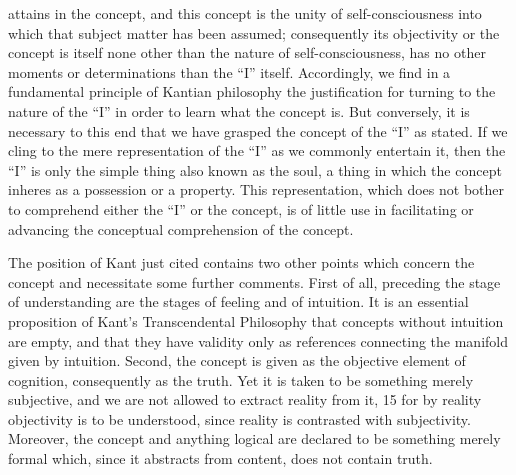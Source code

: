 attains in the concept, and this concept is the unity of self-consciousness into
which that subject matter has been assumed; consequently its objectivity
or the concept is itself none other than the nature of self-consciousness,
has no other moments or determinations than the “I” itself.
Accordingly, we find in a fundamental principle of Kantian philosophy
the justification for turning to the nature of the “I” in order to learn
what the concept is. But conversely, it is necessary to this end that we have
grasped the concept of the “I” as stated. If we cling to the mere representation
of the “I” as we commonly entertain it, then the “I” is only the simple thing
also known as the soul, a thing in which the concept inheres as a possession
or a property. This representation, which does not bother to comprehend
either the “I” or the concept, is of little use in facilitating or advancing the
conceptual comprehension of the concept.

The position of Kant just cited contains two other points which concern
the concept and necessitate some further comments.
First of all, preceding
the stage of understanding are the stages of feeling and of intuition. It is
an essential proposition of Kant’s Transcendental Philosophy that concepts
without intuition are empty, and that they have validity only as references
connecting the manifold given by intuition.
Second, the concept is given
as the objective element of cognition, consequently as the truth. Yet it is
taken to be something merely subjective, and we are not allowed to extract
reality from it, 15 for by reality objectivity is to be understood, since reality
is contrasted with subjectivity.
Moreover, the concept and anything logical are declared to be something
merely formal which, since it abstracts from content, does not contain truth.

